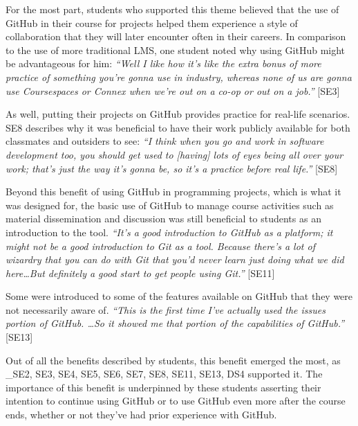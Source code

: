 
For the most part, students who supported this theme believed that the use of GitHub in their course for projects helped them experience a style of collaboration that they will later encounter often in their careers. In comparison to the use of more traditional LMS, one student noted why using GitHub might be advantageous for him: \textit{``Well I like how it's like the extra bonus of more practice of something you're gonna use in industry, whereas none of us are gonna use Coursespaces or Connex when we're out on a co-op or out on a job.''} [SE3]

As well, putting their projects on GitHub provides practice for real-life scenarios. SE8 describes why it was beneficial to have their work publicly available for both classmates and outsiders to see: \textit{``I think when you go and work in software development too, you should get used to [having] lots of eyes being all over your work; that's just the way it's gonna be, so it's a practice before real life.''} [SE8]

Beyond this benefit of using GitHub in programming projects, which is what it was designed for, the basic use of GitHub to manage course activities such as material dissemination and discussion was still beneficial to students as an introduction to the tool. \textit{``It's a good introduction to GitHub as a platform; it might not be a good introduction to Git as a tool. Because there's a lot of wizardry that you can do with Git that you'd never learn just doing what we did here\ldots But definitely a good start to get people using Git.''} [SE11]

Some were introduced to some of the features available on GitHub that they were not necessarily aware of. \textit{``This is the first time I've actually used the issues portion of GitHub. \ldots So it showed me that portion of the capabilities of GitHub.''} [SE13]

Out of all the benefits described by students, this benefit emerged the most, as _{SE2, SE3, SE4, SE5, SE6, SE7, SE8, SE11, SE13, DS4} supported it. The importance of this benefit is underpinned by these students asserting their intention to continue using GitHub or to use GitHub even more after the course ends, whether or not they've had prior experience with GitHub.

